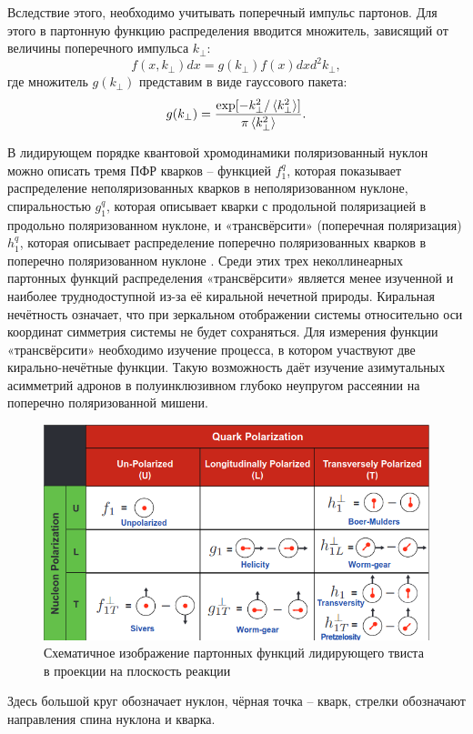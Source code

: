 \documentclass{extarticle}
\begin{document}
 Вследствие этого, необходимо учитывать поперечный импульс партонов. Для этого в партонную функцию распределения вводится множитель, зависящий от величины поперечного импульса $k_{\perp}$:
 \begin{equation}
 	f(x, k_{\perp})dx =g(k_{\perp}) f(x) dx d^2k_{\perp},
 \end{equation}
 где множитель $g(k_{\perp})$ представим в виде гауссового пакета:
 \begin{equation}
 	g(k_{\perp}) = \frac{\exp [-k^2_{\perp} / \braket{k^2_\perp}]}{\pi \braket{k^2_\perp}}.
 \end{equation}

 В лидирующем порядке квантовой хромодинамики поляризованный нуклон можно описать тремя ПФР кварков – функцией $f_1^q$, которая показывает распределение неполяризованных кварков в неполяризованном нуклоне, спиральностью $g_1^q$, которая описывает кварки с продольной поляризацией в продольно поляризованном нуклоне, и «трансвёрсити» (поперечная поляризация) $h_1^q$, которая описывает распределение поперечно поляризованных кварков в поперечно поляризованном нуклоне \cite{Hagler}. Среди этих трех неколлинеарных партонных функций распределения «трансвёрсити» является менее изученной и наиболее труднодоступной из-за её киральной нечетной природы. Киральная нечётность означает, что при зеркальном отображении системы относительно оси координат симметрия системы не будет сохраняться.
Для измерения функции «трансвёрсити» необходимо изучение процесса, в котором участвуют две кирально-нечётные функции. Такую возможность даёт изучение азимутальных асимметрий адронов в полуинклюзивном глубоко неупругом рассеянии на поперечно поляризованной мишени. 


\begin{figure}[h]
	\centering
	\includegraphics[width=\linewidth]{functions.png}
	\caption{Схематичное изображение партонных функций лидирующего твиста в проекции на плоскость реакции}
	\label{fig:functions}
\end{figure} 
Здесь большой круг обозначает нуклон, чёрная точка -- кварк, стрелки обозначают направления спина нуклона и кварка.
\end{document}
